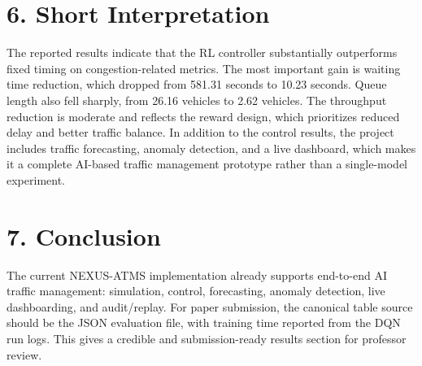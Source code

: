 \documentclass[11pt,a4paper]{article}
\begin{document}
\section*{6. Short Interpretation}
The reported results indicate that the RL controller substantially outperforms fixed timing on congestion-related metrics. The most important gain is waiting time reduction, which dropped from 581.31 seconds to 10.23 seconds. Queue length also fell sharply, from 26.16 vehicles to 2.62 vehicles. The throughput reduction is moderate and reflects the reward design, which prioritizes reduced delay and better traffic balance. In addition to the control results, the project includes traffic forecasting, anomaly detection, and a live dashboard, which makes it a complete AI-based traffic management prototype rather than a single-model experiment.

\section*{7. Conclusion}
The current NEXUS-ATMS implementation already supports end-to-end AI traffic management: simulation, control, forecasting, anomaly detection, live dashboarding, and audit/replay. For paper submission, the canonical table source should be the JSON evaluation file, with training time reported from the DQN run logs. This gives a credible and submission-ready results section for professor review.
\end{document}
